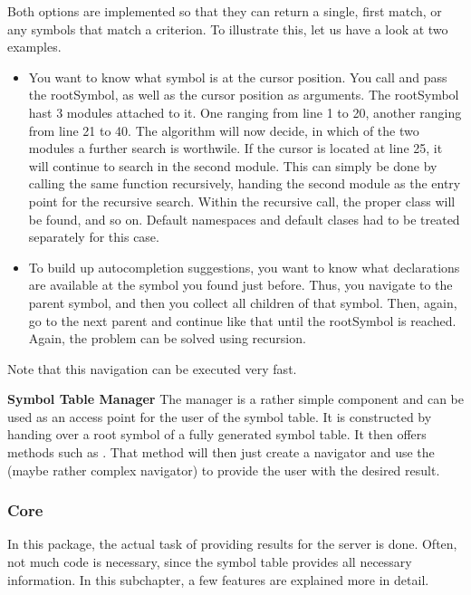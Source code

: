 Both options are implemented so that they can return a single, first match, or any symbols that match a criterion. To illustrate this, let us have a look at two examples.
\begin{itemize}
    \item You want to know what symbol is at the cursor position. You call  and pass the rootSymbol, as well as the cursor position as arguments. The rootSymbol hast 3 modules attached to it. One ranging from line 1 to 20, another ranging from line 21 to 40. The algorithm will now decide, in which of the two modules a further search is worthwile. If the cursor is located at line 25, it will continue to search in the second module. This can simply be done by calling the same function recursively, handing the second module as the entry point for the recursive search. Within the recursive call, the proper class will be found, and so on. Default namespaces and default clases had to be treated separately for this case.
    \item To build up autocompletion suggestions, you want to know what declarations are available at the symbol you found just before. Thus, you navigate to the parent symbol, and then you collect all children of that symbol. Then, again, go to the next parent and continue like that until the rootSymbol is reached. Again, the problem can be solved using recursion.
\end{itemize}
Note that this navigation can be executed very fast.











\textbf{Symbol Table Manager}
The manager is a rather simple component and can be used as an access point for the user of the symbol table. It is constructed by handing over a root symbol of a fully generated symbol table. It then offers methods such as . That method will then just create a navigator and use the (maybe rather complex navigator) to provide the user with the desired result.


\subsubsection{Core}
In this package, the actual task of providing results for the server is done. Often, not much code is necessary, since the symbol table provides all necessary information. In this subchapter, a few features are explained more in detail.

